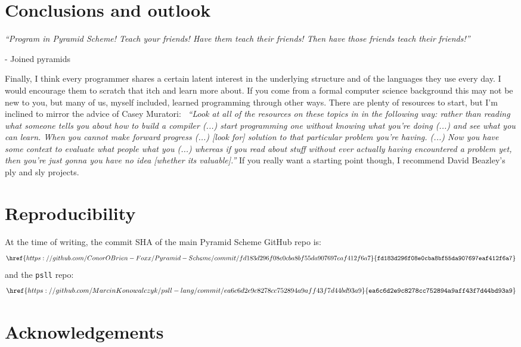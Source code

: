 \documentclass[aip,jcp,reprint,footinbib]{revtex4-1}
\let\tt\texttt
\newcommand\psll{\texttt{psll}\xspace}
\begin{document}
\section{Conclusions and outlook}
\textit{\enquote{Program in Pyramid Scheme! Teach your friends! Have them teach \emph{their} friends! Then have those friends teach \emph{their} friends!}}

- Joined pyramids


Finally, I think every programmer shares a certain latent interest in the underlying structure and of the languages they use every day. I would encourage them to scratch that itch and learn more about. If you come from a formal computer science background this may not be new to you, but many of us, myself included, learned programming through other ways. There are plenty of resources to start, but I'm inclined to mirror the advice of Casey Muratori:~\cite{blow2020qna} \textit{\enquote{Look at all of the resources on these topics in in the following way: rather than reading what someone tells you about how to build a compiler (...) start programming one without knowing what you're doing (...) and see what you can learn. When you cannot make forward progress (...) [look for] solution to that particular problem you're having. (...) Now you have some context to evaluate what people what you (...) whereas if you read about stuff without ever actually having encountered a problem yet, then you're just gonna you have no idea [whether its valuable].}} If you really want a starting point though, I recommend David Beazley's ply and sly projects.
~\cite{dbeaz2018,sly,ply,levine1992}

\section*{Reproducibility}

\setlength{\abovedisplayskip}{3pt}
\setlength{\belowdisplayskip}{3pt}

At the time of writing, the commit SHA of the main Pyramid Scheme GitHub repo\cite{pyra_git} is:
\[
    \href{https://github.com/ConorOBrien-Foxx/Pyramid-Scheme/commit/fd183d296f08e0cba8bf55da907697eaf412f6a7}{\tt{fd183d296f08e0cba8bf55da907697eaf412f6a7}}
\]
and the \psll repo:
\[
    \href{https://github.com/MarcinKonowalczyk/psll-lang/commit/ea6c6d2e9c8278cc752894a9aff43f7d44bd93a9}{\tt{ea6c6d2e9c8278cc752894a9aff43f7d44bd93a9}}
\]

\section*{Acknowledgements}
\end{document}
